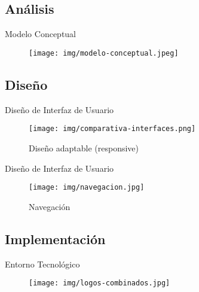 \documentclass[spanish,xcolor=table,svgnames]{beamer}
\begin{document}
\subsection*{Análisis}
\begin{frame}{Modelo Conceptual}
  \begin{figure}[H]
    \begin{center}
        \texttt{[image: img/modelo-conceptual.jpeg]}
    \end{center}
    \label{fig:conceptual}
\end{figure}
\end{frame}


\subsection*{Diseño}
\begin{frame}{Diseño de Interfaz de Usuario}
  \begin{figure}[H]
    \begin{center}
        \texttt{[image: img/comparativa-interfaces.png]}
    \end{center}
      \caption{Diseño adaptable (responsive)}
    \label{fig:responsive}
\end{figure}
\end{frame}

\begin{frame}{Diseño de Interfaz de Usuario}
  \begin{figure}[H]
    \begin{center}
      \texttt{[image: img/navegacion.jpg]}
    \end{center}
      \caption{Navegación}
    \label{fig:navegacion}
\end{figure}
\end{frame}





\subsection*{Implementación}

\begin{frame}{Entorno Tecnológico}
  \begin{figure}[H]
    \begin{center}
        \texttt{[image: img/logos-combinados.jpg]}
    \end{center}
    \label{fig:tecnologias}
  \end{figure}
\end{frame}
\end{document}
